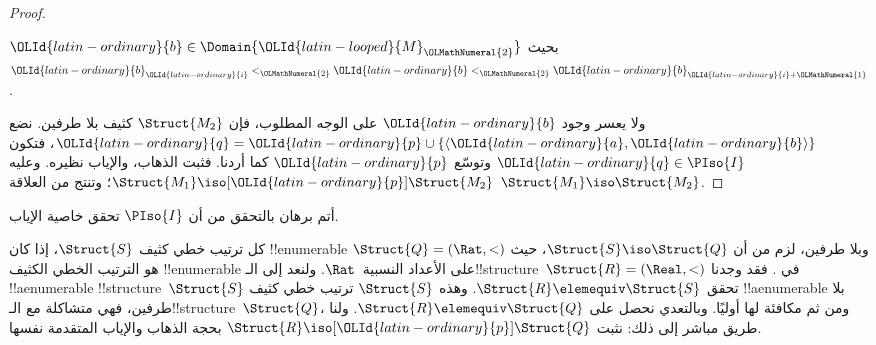 \documentclass[../../../include/open-logic-section]{subfiles}
\begin{document}
\begin{proof}
\begin{enumerate}
   $\OLId{latin-ordinary}{b} \in \Domain{\OLId{latin-looped}{M}_\OLMathNumeral{2}}$ بحيث $\OLId{latin-ordinary}{b}_\OLId{latin-ordinary}{i} <_\OLMathNumeral{2} \OLId{latin-ordinary}{b} <_\OLMathNumeral{2} \OLId{latin-ordinary}{b}_{\OLId{latin-ordinary}{i}+\OLMathNumeral{1}}$.
  \end{enumerate}
  ولا يعسر وجود $\OLId{latin-ordinary}{b}$ على الوجه المطلوب، فإن $\Struct{M_2}$
  كثيف بلا طرفين. نضع $\OLId{latin-ordinary}{q} = \OLId{latin-ordinary}{p} \cup \{ \langle \OLId{latin-ordinary}{a}, \OLId{latin-ordinary}{b} \rangle \}$،
  فتكون $\OLId{latin-ordinary}{q} \in \PIso{I}$ وتوسّع $\OLId{latin-ordinary}{p}$ كما أردنا. فثبت الذهاب،
  والإياب نظيره. وعليه $\Struct{M_1} \iso[\OLId{latin-ordinary}{p}] \Struct{M_2}$؛
  وتنتج من  العلاقة
  $\Struct{M_1} \iso \Struct{M_2}$.
\end{proof}

\begin{prob}
  أتم برهان  بالتحقق من أن
  $\PIso{I}$ تحقق خاصية الإياب.
\end{prob}

\begin{rem}
  كل ترتيب خطي كثيف $\Struct{S}$، إذا كان !!{enumerable} وبلا
  طرفين، لزم من  أن $\Struct{S} \iso \Struct{Q}$،
  حيث $\Struct{Q} = (\Rat, <)$ هو الترتيب الخطي الكثيف
  !!{enumerable} على الأعداد النسبية~$\Rat$. ولنعد إلى
  الـ!!{structure}~$\Struct{R} = (\Real, <)$ في
  . فقد وجدنا !!a{enumerable}
  !!{structure}~$\Struct{S}$ تحقق $\Struct{R} \elemequiv \Struct{S}$.
  وهذه $\Struct{S}$ ترتيب خطي كثيف !!a{enumerable} بلا طرفين،
  فهي متشاكلة مع الـ!!{structure}~$\Struct{Q}$، ومن ثم مكافئة
  لها أوليًا. وبالتعدي نحصل على $\Struct{R} \elemequiv \Struct{Q}$.
  ولنا طريق مباشر إلى ذلك: نثبت $\Struct{R} \iso[\OLId{latin-ordinary}{p}] \Struct{Q}$
  بحجة الذهاب والإياب المتقدمة نفسها.
\end{rem}
\end{document}
